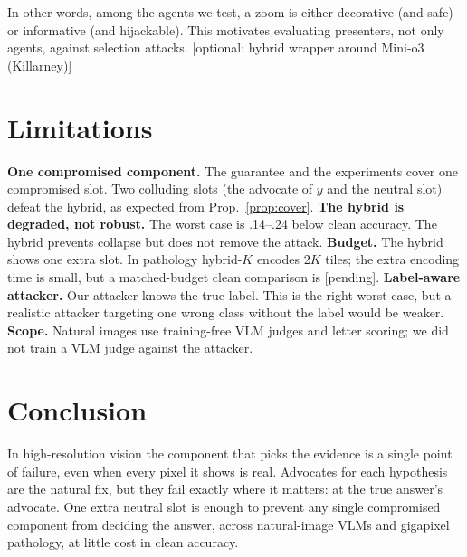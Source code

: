 \documentclass[10pt,twocolumn,letterpaper]{article}
\newcommand{\pend}[1]{{\color{red}[#1]}}
\begin{document}
In other words, among the agents we test, a zoom is either decorative (and safe) or informative (and hijackable). This motivates evaluating presenters, not only agents, against selection attacks. \pend{optional: hybrid wrapper around Mini-o3 (Killarney)}

\section{Limitations}\label{sec:limits}
\textbf{One compromised component.} The guarantee and the experiments cover one compromised slot. Two colluding slots (the advocate of $y$ and the neutral slot) defeat the hybrid, as expected from Prop.~\ref{prop:cover}.
\textbf{The hybrid is degraded, not robust.} The worst case is .14--.24 below clean accuracy. The hybrid prevents collapse but does not remove the attack.
\textbf{Budget.} The hybrid shows one extra slot. In pathology hybrid-$K$ encodes 2$K$ tiles; the extra encoding time is small, but a matched-budget clean comparison is \pend{pending}.
\textbf{Label-aware attacker.} Our attacker knows the true label. This is the right worst case, but a realistic attacker targeting one wrong class without the label would be weaker.
\textbf{Scope.} Natural images use training-free VLM judges and letter scoring; we did not train a VLM judge against the attacker.

\section{Conclusion}
In high-resolution vision the component that picks the evidence is a single point of failure, even when every pixel it shows is real. Advocates for each hypothesis are the natural fix, but they fail exactly where it matters: at the true answer's advocate. One extra neutral slot is enough to prevent any single compromised component from deciding the answer, across natural-image VLMs and gigapixel pathology, at little cost in clean accuracy.

{\small

}
\end{document}
